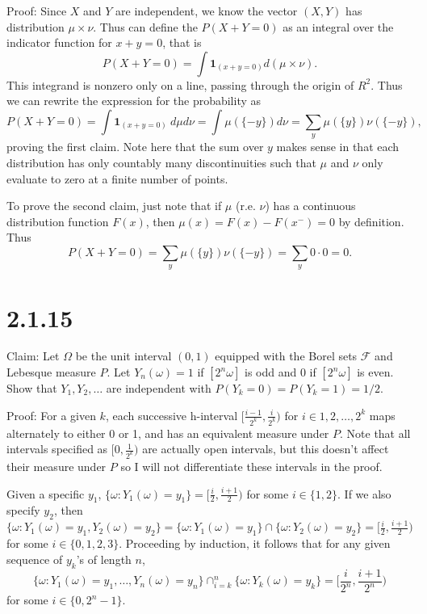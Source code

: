 \documentclass[10pt]{article}
\begin{document}
Proof: Since $X$ and $Y$ are independent,
we know the vector $(X,Y)$ has distribution $\mu \times \nu$.
Thus can define the $P(X+Y = 0)$ as an integral over 
the indicator function for $x + y = 0$, that is
\begin{equation*}
  P(X +Y = 0) = \int \mathbf{1}_{(x + y = 0)} d(\mu \times \nu).
\end{equation*}
This integrand is nonzero only on a line,
passing through the origin of $R^2$.
Thus we can rewrite the expression for the probability as
\begin{equation*}
  P(X+Y = 0) = \int \mathbf{1}_{(x + y = 0)} \ d\mu d\nu
  = \int \mu(\{-y\}) d\nu
  = \sum_y \mu(\{y\}) \nu(\{-y\}),
\end{equation*}
proving the first claim. Note here that the sum over $y$
makes sense in that each distribution has only 
countably many discontinuities such that $\mu$ and $\nu$
only evaluate to zero at a finite number of points.

To prove the second claim,
just note that if  $\mu$ (r.e. $\nu$) has a continuous distribution
function $F(x)$, then $\mu(x) = F(x) - F(x^-) = 0$ by definition.
Thus
\begin{equation*}
  P(X+Y=0) = \sum_y \mu(\{y\}) \nu(\{-y\})
  = \sum_y 0 \cdot 0 = 0.
\end{equation*}

\section*{2.1.15}
Claim: Let $\Omega$ be the unit interval $(0,1)$
equipped with the Borel sets $\mathcal{F}$ and 
Lebesque measure $P$. Let $Y_n(\omega) = 1$ if $[2^n \omega]$
is odd and $0$ if $[2^n \omega]$ is even.
Show that $Y_1, Y_2, \dots$ are independent with
$P(Y_k = 0) = P(Y_k=1) = 1/2$.

Proof: For a given $k$, each successive h-interval
$[\frac{i-1}{2^k}, \frac{i}{2^k})$
for $i \in 1,2,\dots,2^k$ maps alternately to either
0 or 1, and has an equivalent measure under $P$.
Note that all intervals specified as $[0,\frac{1}{2^k})$
are actually open intervals, 
but this doesn't affect their measure under $P$
so I will not differentiate these intervals in the proof.

Given a specific $y_1$, $\{\omega: Y_1(\omega) = y_1\} 
= [\frac{i}{2}, \frac{i+1}{2})$ for some $i \in \{1,2\}$.
If we also specify $y_2$, then
$\{\omega: Y_1(\omega) = y_1, Y_2(\omega) = y_2\} 
= \{\omega: Y_1(\omega) = y_1\} \cap \{\omega: Y_2(\omega) = y_2\}
= [\frac{i}{2}, \frac{i+1}{2})$ for some $i \in \{0,1,2,3\}$.
Proceeding by induction, it follows that for any given
sequence of $y_k$'s of length $n$,
\begin{equation*}
  \{\omega: Y_1(\omega) = y_1, \dots, Y_n(\omega) = y_n\}
  \cap_{i=k}^n\{\omega: Y_k(\omega) = y_k\}
  = [\frac{i}{2^n}, \frac{i+1}{2^n})
\end{equation*} 
for some $i \in \{0, 2^n-1\}$.
\end{document}
